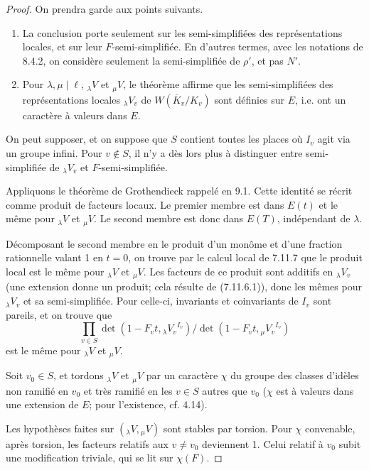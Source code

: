 \documentclass[11pt]{amsart}
\theoremstyle{plain}
\theoremstyle{definition}
\begin{document}
\begin{proof}
On prendra garde aux points suivants.
\begin{enumerate}
\item[(a)] La conclusion porte seulement sur les semi-simplifi\'ees des repr\'esentations locales, et sur leur $F$-semi-simplifi\'ee. En d'autres termes, avec les notations de 8.4.2, on consid\`ere seulement la semi-simplifi\'ee de $\rho'$, et pas $N'$.
\item[(b)] Pour $\lambda, \mu \mid \ell$, $_\lambda V$ et $_\mu V$, le th\'eor\`eme affirme que les semi-simplifi\'ees des repr\'esentations locales $_\lambda V_v$ de $W(\overline{K}_v/K_v)$ sont d\'efinies sur $E$, i.e. ont un caract\`ere \`a valeurs dans $E$.
\end{enumerate}

On peut supposer, et on suppose que $S$ contient toutes les places o\`u $I_v$ agit via un groupe infini. Pour $v \notin S$, il n'y a d\`es lors plus \`a distinguer entre semi-simplifi\'ee de $_\lambda V_v$ et $F$-semi-simplifi\'ee.

Appliquons le th\'eor\`eme de Grothendieck rappel\'e en 9.1. Cette identit\'e se r\'ecrit comme produit de facteurs locaux. Le premier membre est dans $E(t)$ et le m\^eme pour $_\lambda V$ et $_\mu V$. Le second membre est donc dans $E(T)$, ind\'ependant de $\lambda$.

D\'ecomposant le second membre en le produit d'un mon\^ome et d'une fraction rationnelle valant 1 en $t=0$, on trouve par le calcul local de 7.11.7 que le produit local est le m\^eme pour $_\lambda V$ et $_\mu V$. Les facteurs de ce produit sont additifs en $_\lambda V_v$ (une extension donne un produit; cela r\'esulte de (7.11.6.1)), donc les m\^emes pour $_\lambda V_v$ et sa semi-simplifi\'ee. Pour celle-ci, invariants et coinvariants de $I_v$ sont pareils, et on trouve que
\begin{equation}
\prod_{v \in S} \det(1 - F_v t, {_\lambda V_v}^{I_v}) / \det(1 - F_v t, {_\mu V_v}^{I_v})
\tag{9.8.1}
\end{equation}
est le m\^eme pour $_\lambda V$ et $_\mu V$.

Soit $v_0 \in S$, et tordons $_\lambda V$ et $_\mu V$ par un caract\`ere $\chi$ du groupe des classes d'id\`eles non ramifi\'e en $v_0$ et tr\`es ramifi\'e en les $v \in S$ autres que $v_0$ ($\chi$ est \`a valeurs dans une extension de $E$; pour l'existence, cf. 4.14).

Les hypoth\`eses faites sur $(_\lambda V, {_\mu V})$ sont stables par torsion. Pour $\chi$ convenable, apr\`es torsion, les facteurs relatifs aux $v \not= v_0$ deviennent 1. Celui relatif \`a $v_0$ subit une modification triviale, qui se lit sur $\chi(F)$.


\end{proof}
\end{document}
